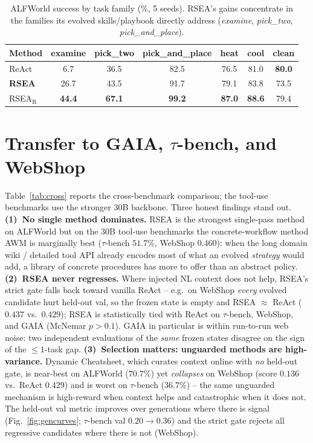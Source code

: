 \documentclass{article}
\begin{document}
\begin{table}[t]
  \centering
  \caption{ALFWorld success by task family (\%, 5 seeds). RSEA's gains concentrate in
  the families its evolved skills/playbook directly address (\emph{examine},
  \emph{pick\_two}, \emph{pick\_and\_place}).}
  \label{tab:bytype}
  \footnotesize
  \begin{tabular}{lcccccc}
    \toprule
    \textbf{Method} & examine & pick\_two & pick\_and\_place & heat & cool & clean \\
    \midrule
    ReAct           & 6.7  & 36.5 & 82.5 & 76.5 & 81.0 & \textbf{80.0} \\
    \textbf{RSEA}   & 26.7 & 43.5 & 91.7 & 79.1 & 83.8 & 73.5 \\
    RSEA$_\text{R}$ & \textbf{44.4} & \textbf{67.1} & \textbf{99.2} & \textbf{87.0} & \textbf{88.6} & 79.4 \\
    \bottomrule
  \end{tabular}
\end{table}

\section{Transfer to GAIA, $\tau$-bench, and WebShop}
\label{sec:transfer}
Table~\ref{tab:cross} reports the cross-benchmark comparison; the tool-use benchmarks
use the stronger 30B backbone. Three honest findings stand out.
\textbf{(1)~No single method dominates.} RSEA is the strongest single-pass method on
ALFWorld but on the 30B tool-use benchmarks the concrete-workflow method AWM is
marginally best ($\tau$-bench $51.7\%$, WebShop $0.460$): when the long domain wiki /
detailed tool API already encodes most of what an evolved \emph{strategy} would add,
a library of concrete procedures has more to offer than an abstract policy.
\textbf{(2)~RSEA never regresses.} Where injected NL context does not help, RSEA's
strict gate falls back toward vanilla ReAct -- e.g.\ on WebShop \emph{every} evolved
candidate hurt held-out val, so the frozen state is empty and RSEA $\approx$ ReAct
($0.437$ vs.\ $0.429$); RSEA is statistically tied with ReAct on $\tau$-bench,
WebShop, and GAIA (McNemar $p{>}0.1$). GAIA in particular is within run-to-run web
noise: two independent evaluations of the \emph{same} frozen states disagree on the
sign of the $\le 1$-task gap.
\textbf{(3)~Selection matters: unguarded methods are high-variance.} Dynamic
Cheatsheet, which curates context online with \emph{no} held-out gate, is near-best
on ALFWorld ($70.7\%$) yet \emph{collapses} on WebShop (score $0.136$ vs.\ ReAct
$0.429$) and is worst on $\tau$-bench ($36.7\%$) -- the same unguarded mechanism is
high-reward when context helps and catastrophic when it does not. The held-out val
metric improves over generations where there is signal (Fig.~\ref{fig:gencurves};
$\tau$-bench val $0.20{\to}0.36$) and the strict gate rejects all regressive
candidates where there is not (WebShop).
\end{document}
